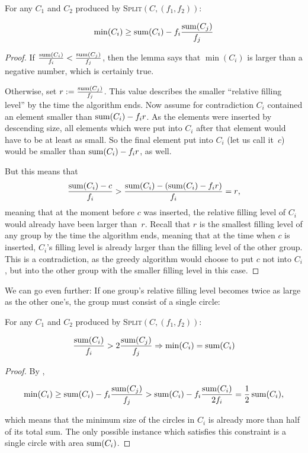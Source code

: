 \documentclass[a4paper,style=print,bibliography=totoc,nexus,lnum,extramargin]{tubsbook}
\begin{document}
\begin{lemma}\label{th:min1}
    For any $C_1$ and $C_2$ produced by \textsc{Split}$(C,(f_1,f_2))$:

    $$\min(C_i) \ge \operatorname{sum}(C_i) - f_i\frac{\operatorname{sum}(C_j)}{f_j}$$
\end{lemma}

\begin{proof}
    If $\frac{\operatorname{sum}(C_i)}{f_i} < \frac{\operatorname{sum}(C_j)}{f_j}$, then the lemma says that $\min(C_i)$ is larger than a negative number, which is certainly true.

    Otherwise, set $r := \frac{\operatorname{sum}(C_j)}{f_j}$. This value describes the smaller “relative filling level” by the time the algorithm ends.
    Now assume for contradiction $C_i$ contained an element smaller than $\operatorname{sum}(C_i) - f_i r$. As the elements were inserted by descending size, all elements which were put into $C_i$ after that element would have to be at least as small. So the final element put into $C_i$ (let us call it~$c$) would be smaller than $\operatorname{sum}(C_i) - f_i r$, as well.

    But this means that $$\frac{\operatorname{sum}(C_i) - c}{f_i} > \frac{\operatorname{sum}(C_i) - (\operatorname{sum}(C_i) - f_i r)}{f_i} = r\text{,}$$ meaning that at the moment before $c$ was inserted, the relative filling level of $C_i$ would already have been larger than~$r$.
    Recall that $r$ is the smallest filling level of any group by the time the algorithm ends, meaning that at the time when $c$ is inserted, $C_i$'s filling level is already larger than the filling level of the other group.
    This is a contradiction, as the greedy algorithm would choose to put $c$ not into $C_i$, but into the other group with the smaller filling level in this case.
\end{proof}

We can go even further: If one group's relative filling level becomes twice as large as the other one's, the group must consist of a single circle:

\begin{lemma}\label{th:min2}
    For any $C_1$ and $C_2$ produced by \textsc{Split}$(C,(f_1,f_2))$:

    $$\frac{\operatorname{sum}(C_i)}{f_i} > 2\frac{\operatorname{sum}(C_j)}{f_j} \Rightarrow \min(C_i) = \operatorname{sum}(C_i)$$
\end{lemma}

\begin{proof}
    By ,

    $$\min(C_i) \ge \operatorname{sum}(C_i) - f_i\frac{\operatorname{sum}(C_j)}{f_j} > \operatorname{sum}(C_i) - f_i\frac{\operatorname{sum}(C_i)}{2f_i} = \frac{1}{2}\operatorname{sum}(C_i)\text{,}$$

    which means that the minimum size of the circles in $C_i$ is already more than half of its total sum. The only possible instance which satisfies this constraint is a single circle with area $\operatorname{sum}(C_i)$.
\end{proof}
\end{document}
